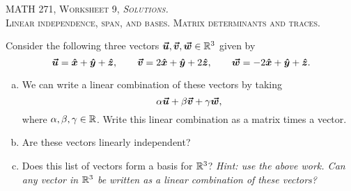 \documentclass[12pt]{article} %
\begin{document}
\begin{center}
   \textsc{\large MATH 271, Worksheet 9, \emph{Solutions.}}\\
   \textsc{Linear independence, span, and bases. Matrix determinants and traces.}
\end{center}
\vspace{.5cm}



\begin{problem}
Consider the following three vectors $\boldsymbol{\boldsymbol{\vec{u}}},\boldsymbol{\boldsymbol{\vec{v}}},\boldsymbol{\boldsymbol{\vec{w}}}\in \mathbb{R}^3$ given by
\[
\boldsymbol{\boldsymbol{\vec{u}}} = \boldsymbol{\hat{x}} + \boldsymbol{\hat{y}} +\boldsymbol{\hat{z}}, \qquad \boldsymbol{\boldsymbol{\vec{v}}} = 2\boldsymbol{\hat{x}} + \boldsymbol{\hat{y}} + 2\boldsymbol{\hat{z}}, \qquad \boldsymbol{\boldsymbol{\vec{w}}} = -2\boldsymbol{\hat{x}} + \boldsymbol{\hat{y}} +\boldsymbol{\hat{z}}. 
\]
\begin{enumerate}[(a)]
    \item We can write a linear combination of these vectors by taking
    \[
    \alpha \boldsymbol{\boldsymbol{\vec{u}}} + \beta \boldsymbol{\boldsymbol{\vec{v}}} + \gamma \boldsymbol{\boldsymbol{\vec{w}}},
    \]
    where $\alpha,\beta,\gamma \in \mathbb{R}$.  Write this linear combination as a matrix times a vector.
    \item Are these vectors linearly independent?
    \item Does this list of vectors form a basis for $\mathbb{R}^3$? \emph{Hint: use the above work. Can any vector in $\mathbb{R}^3$ be written as a linear combination of these vectors?}
\end{enumerate}
\end{problem}
\end{document}
